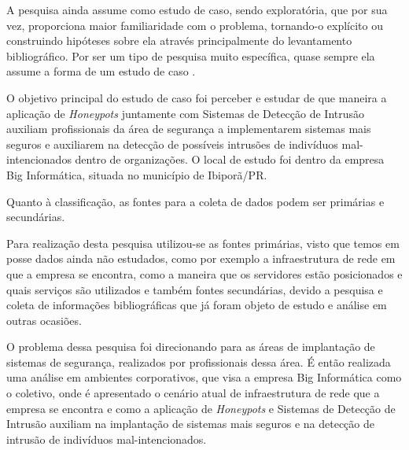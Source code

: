 A pesquisa ainda assume como estudo de caso, sendo exploratória, que por sua vez, proporciona maior familiaridade com o problema, tornando-o explícito ou construindo hipóteses sobre ela através principalmente do levantamento bibliográfico. Por ser um tipo de pesquisa muito específica, quase sempre ela assume a forma de um estudo de caso \cite{gil2008}.

O objetivo principal do estudo de caso foi perceber e estudar de que maneira a aplicação de \textit{Honeypots} juntamente com Sistemas de Detecção de Intrusão auxiliam profissionais da área de segurança a implementarem sistemas mais seguros e auxiliarem na detecção de possíveis intrusões de indivíduos mal-intencionados dentro de organizações. O local de estudo foi dentro da empresa Big Informática, situada no município de Ibiporã/PR.

Quanto à classificação, as fontes para a coleta de dados podem ser primárias e secundárias. 

Para realização desta pesquisa utilizou-se as fontes primárias, visto que temos em posse dados ainda não estudados, como por exemplo a infraestrutura de rede em que a empresa se encontra, como a maneira que os servidores estão posicionados e quais serviços são utilizados e também fontes secundárias, devido a pesquisa e coleta de informações bibliográficas que já foram objeto de estudo e análise em outras ocasiões.

O problema dessa pesquisa foi direcionando para as áreas de implantação de sistemas de segurança, realizados por profissionais dessa área. É então realizada uma análise em ambientes corporativos, que visa a empresa Big Informática como o coletivo, onde é apresentado o cenário atual de infraestrutura de rede que a empresa se encontra e como a aplicação de \textit{Honeypots} e Sistemas de Detecção de Intrusão auxiliam na implantação de sistemas mais seguros e na detecção de intrusão de indivíduos mal-intencionados.

